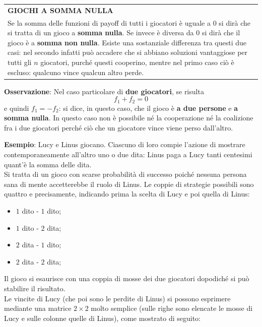 \documentclass[a4paper]{extarticle}
\renewcommand\arraystretch{}
\begin{document}
\vspace{1em}
\setlength{\tabcolsep}{14pt}
\renewcommand{\arraystretch}{2}
\noindent
\begin{tabularx}{\textwidth}{@{}|P|@{}}
    \hline
    {\textbf{GIOCHI A SOMMA NULLA}}\\
    \parbox{\linewidth}{Se la somma delle funzioni di payoff di tutti i giocatori è uguale a $0$ si dirà che si tratta di un gioco a \textbf{somma nulla}.\\
    Se invece è diversa da $0$ si dirà che il gioco è a \textbf{somma non nulla}.\\
    Esiste una sostanziale differenza tra questi due casi: nel secondo infatti può accadere che si abbiano soluzioni vantaggiose per tutti gli $n$ giocatori, purché questi cooperino, mentre nel primo caso ciò è escluso: qualcuno vince qualcun altro perde.
    \vspace{3mm}}\\
    \hline
\end{tabularx}

\vspace{2em}
\noindent
\textbf{Osservazione}: Nel caso particolare di \textbf{due giocatori}, se risulta
\[f_1 + f_2 = 0\]
e quindi $f_1=-f_2$: si dice, in questo caso, che il gioco è \textbf{a due persone} e \textbf{a somma nulla}. In questo caso non è possibile né la cooperazione né la coalizione fra i due giocatori perché ciò che un giocatore vince viene perso dall'altro.

\vspace{2em}
\noindent
\textbf{Esempio}: Lucy e Linus giocano. Ciascuno di loro compie l'azione di mostrare contemporaneamente all'altro uno o due dita: Linus paga a Lucy tanti centesimi quant'è la somma delle dita.\\
Si tratta di un gioco con scarse probabilità di successo poiché nessuna persona sana di mente accetterebbe il ruolo di Linus. Le coppie di strategie possibili sono quattro e precisamente, indicando prima la scelta di Lucy e poi quella di Linus:
\begin{itemize}
    \item $1$ dito - $1$ dito;
    \item $1$ dito - $2$ dita;
    \item $2$ dita - $1$ dito;
    \item $2$ dita - $2$ dita;
\end{itemize}
Il gioco si esaurisce con una coppia di mosse dei due giocatori dopodiché si può stabilire il risultato.\\
Le vincite di Lucy (che poi sono le perdite di Linus) si possono esprimere mediante una matrice $2 \times 2$ molto semplice (sulle righe sono elencate le mosse di Lucy e sulle colonne quelle di Linus), come mostrato di seguito:
\end{document}
